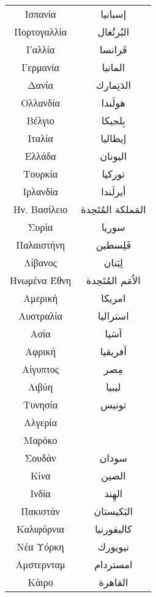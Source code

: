 \documentclass[twocolumn,a4paper]{article}
\newcommand{\ar}[1]{\textarabic{#1}}
\begin{document}
\begin{supertabular}{ c c }
Ισπανία      & \ar{ إسبانيا } \\
Πορτογαλλία  & \ar{ البُرتُغال } \\
Γαλλία       & \ar{ فَرانسا } \\
Γερμανία     & \ar{ المانيا } \\
Δανία        & \ar{  الدَنِمارك} \\
Ολλανδία     & \ar{ هولَندا } \\
Βέλγιο       & \ar{ بِلجيكا } \\

Ιταλία       & \ar{ إيطاليا } \\
Ελλάδα       & \ar{ اليونان } \\
Τουρκία      & \ar{ توركيا } \\

Ιρλανδία     & \ar{ أيرلَندا } \\
Ην. Βασίλειο & \ar{ المَملكة المُتَحِدة }\\

Συρία        & \ar{ سوريا } \\
Παλαιστήνη   & \ar{ فَلِسطين } \\
Λίβανος      & \ar{ لِبَنان } \\


Ηνωμένα Έθνη & \ar{ اﻻُمَم المُتَحِدة } \\
Αμερική      & \ar{ امريكا } \\
Αυστραλία    & \ar{ استراليا } \\
Ασία         & \ar{ آسَيا } \\
Αφρική       & \ar{ أفريقيا } \\

Αίγυπτος     & \ar{ مِصر } \\
Λιβύη        & \ar{ ليبيا } \\
Τυνησία      & \ar{ تونيس } \\
Αλγερία      & \\  %
Μαρόκο       & \\ %
Σουδάν       & \ar{ سودان } \\


Κίνα         & \ar{ الصين } \\
Ινδία        & \ar{ الهِند } \\
Πακιστάν     & \ar{ البَكيستان } \\
Καλιφόρνια   & \ar{ كاليفورنيا } \\
Νέα Υόρκη    & \ar{ نيويورك } \\
Αμστερνταμ   & \ar{ امستردام } \\
Κάιρο        & \ar{ القاهرة } \\


\end{supertabular}
\end{document}
